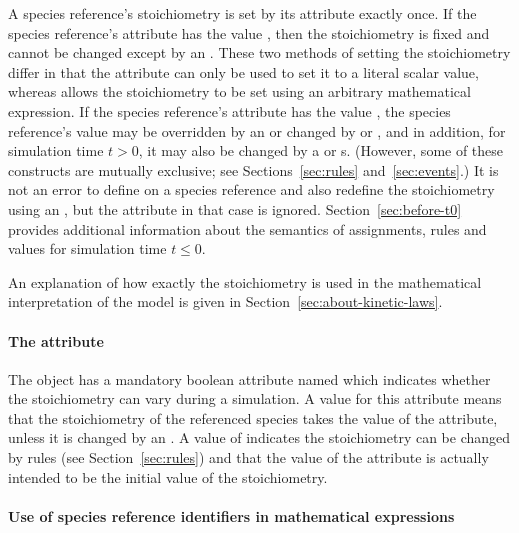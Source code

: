 A species reference's stoichiometry is set by its  
attribute exactly once.  If the species reference's  
attribute has the value
, then the stoichiometry is fixed and cannot be
changed except by an \InitialAssignment.  These two methods of
setting the stoichiometry differ in that the 
attribute can only be used to set it to a literal scalar value,
whereas \InitialAssignment allows the stoichiometry to be set using an
arbitrary mathematical expression.  If the species reference's
 attribute has the value , the species reference's
value may be overridden by an \InitialAssignment or changed by
\AssignmentRule or \AlgebraicRule, and in addition, for simulation
time $t > 0$, it may also be changed by a \RateRule or \Event{}s.
(However, some of these constructs are mutually exclusive; see
Sections~\ref{sec:rules} and~\ref{sec:events}.)  It is not an
error to define  on a species reference and also 
redefine the stoichiometry using an \InitialAssignment, but the 
 attribute in that case is ignored.  
Section~\ref{sec:before-t0} provides additional
information about the semantics of assignments, rules and values
for simulation time $t \leq 0$.

An explanation of how exactly the stoichiometry is used in the mathematical interpretation 
of the model is given in Section~\ref{sec:about-kinetic-laws}.


\paragraph{The  attribute}

The \SpeciesReference object has a mandatory boolean attribute named
 which indicates whether the stoichiometry can
vary during a simulation. A value  for this attribute means that 
the stoichiometry of the referenced species takes the value of the 
 attribute, unless it is changed by an \InitialAssignment.
A value of  indicates the stoichiometry 
can be changed by rules (see Section~\ref{sec:rules}) and
that the value of the  attribute is actually intended to be the initial
value of the stoichiometry.

\paragraph{Use of species reference identifiers in mathematical expressions}

